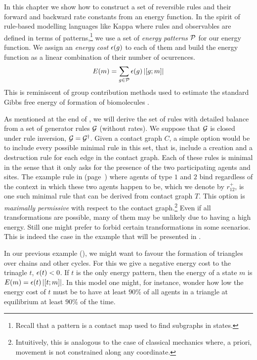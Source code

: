 In this chapter we show how to construct a set of reversible rules
and their forward and backward rate constants from an energy function.
In the spirit of rule-based modelling languages like Kappa
where rules and observables are defined in terms of patterns,\footnote{
  Recall that a pattern is a contact map used to find subgraphs in states.}
we use a set of \emph{energy patterns} $\mathcal{P}$
for our energy function.
We assign an \emph{energy cost} $\epsilon(g)$ to each of them
and build the energy function as a linear combination
of their number of ocurrences. %
\[ E(m) = \sum_{g \in \mathcal{P}} \epsilon(g) \left\lvert \left[g;m\right] \right\rvert \]
This is reminiscent of group contribution methods
used to estimate the standard Gibbs free energy of formation
of biomolecules \citep{group-contrib}.

As mentioned at the end of ,
we will derive the set of rules with detailed balance
from a set of generator rules $\mathcal{G}$ (without rates).
We suppose that $\mathcal{G}$ is closed under
rule inversion, \ie $\mathcal{G} = \mathcal{G}^\dagger$.
Given a contact graph $C$,
a simple option would be to include
every possible minimal rule in this set,
that is, include a creation and a destruction rule
for each edge in the contact graph.
Each of these rules is minimal in the sense that
it only asks for the presence of
the two participating agents and sites.
The example rule in  (page~\pageref{p:example})
where agents of type $1$ and $2$ bind
regardless of the context
in which these two agents happen to be,
which we denote by $r^+_{12}$,
is one such minimal rule
that can be derived from contact graph $T$.
This option is \emph{maximally permissive}
with respect to the contact graph.\footnote{
  Intuitively, this is analogous to the case of classical mechanics
  where, a priori, movement is not constrained along any coordinate.}
Even if all transformations are possible,
many of them may be unlikely due to having a high energy.
Still one might prefer to forbid certain transformations
in some scenarios.
This is indeed the case in the example
that will be presented in .

In our previous example (),
we might want to favour the formation of
triangles over chains and other cycles.
For this we give a negative energy cost to the trinagle $t$,
\ie $\epsilon(t) < 0$.
If $t$ is the only energy pattern,
then the energy of a state $m$ is
$E(m) = \epsilon(t) \left\lvert \left[t;m\right] \right\rvert$.
In this model one might, for instance,
wonder how low the energy cost of $t$ must be
to have at least $90\%$ of all agents in a triangle
at equilibrium at least $90\%$ of the time.

